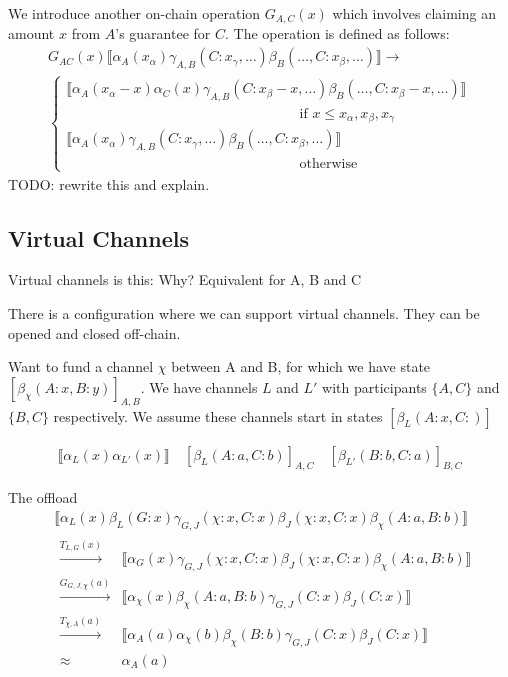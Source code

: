 \documentclass{article}
\theoremstyle{definition}
\newcommand{\adj}[1]{\llbracket #1 \rrbracket}
\newcommand{\enf}[1]{[#1]}
\begin{document}
We introduce another on-chain operation $G_{A, C}(x)$ which involves claiming an amount $x$ from $A$'s guarantee for $C$. The operation is defined as follows:
\begin{multline*}
G_{AC}(x) \adj{\alpha_A(x_\alpha)\gamma_{A,B}(C:x_\gamma, \dots)\beta_B(\dots, C:x_\beta, \dots)} \rightarrow \\
  \begin{cases}
      \adj{\alpha_A(x_\alpha - x)\alpha_C(x)\gamma_{A,B}(C:x_\beta -x, \dots)\beta_B(\dots, C:x_\beta - x, \dots)} \\
      \hspace{7cm} \text{if } x \leq x_\alpha, x_\beta, x_\gamma \\
      \adj{\alpha_A(x_\alpha)\gamma_{A,B}(C:x_\gamma, \dots)\beta_B(\dots, C:x_\beta, \dots)} \\
      \hspace{7cm} \text{otherwise}
  \end{cases}
\end{multline*}
TODO: rewrite this and explain.



\subsection{Virtual Channels}

Virtual channels is this: 
Why? Equivalent for A, B and C



There is a configuration where we can support virtual channels.
They can be opened and closed off-chain.

Want to fund a channel $\chi$ between A and B, for which we have state $\enf{\beta_\chi(A: x, B:y)}_{A,B}$. We have channels $L$ and $L'$ with participants $\{A, C\}$ and $\{B, C\}$ respectively. We assume these channels start in states $\enf{\beta_L(A:x, C:)}$

\begin{align*}
  \adj{\alpha_L(x)\alpha_{L'}(x)} \quad \enf{\beta_L(A: a, C: b)}_{A,C} \quad \enf{\beta_{L'}(B:b, C:a)}_{B, C}
\end{align*}

The offload
\begin{align*}
  & \adj{\alpha_L(x)\beta_L(G: x)\gamma_{G,J}(\chi: x, C: x)\beta_J(\chi: x, C: x)\beta_\chi(A: a, B: b)}\\ 
  & \begin{aligned}
   \xrightarrow{T_{L,G}(x)} & \adj{\alpha_G(x)\gamma_{G, J}(\chi: x, C: x)\beta_J(\chi: x, C: x)\beta_\chi(A: a, B: b)} \\
   \xrightarrow{G_{G, J, \chi}(a)} & \adj{\alpha_\chi(x)\beta_\chi(A: a, B: b)\gamma_{G, J}(C: x)\beta_J(C: x)} \\
   \xrightarrow{T_{\chi, A}(a)} & \adj{\alpha_A(a)\alpha_\chi(b)\beta_\chi(B: b)\gamma_{G, J}(C: x)\beta_J(C: x)} \\
   \approx & \alpha_A(a)
  \end{aligned}
\end{align*}
\end{document}
